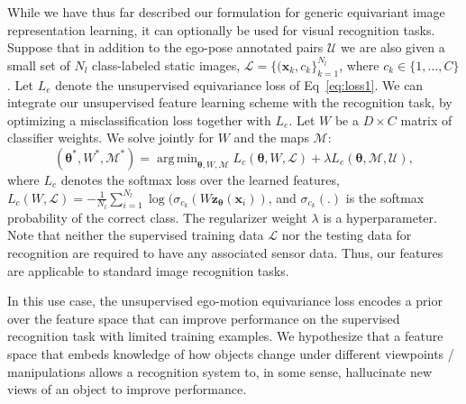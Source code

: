 \documentclass[10pt,twocolumn,letterpaper]{article}
\DeclareMathOperator*{\argmin}{arg\,min}
\newcommand{\newchanges}{}
\newcommand{\changes}{}
\begin{document}
While we have thus far described our formulation for generic equivariant image representation learning, it can optionally be used for visual recognition tasks.
Suppose that in addition to the ego-pose annotated pairs $\mathcal{U}$ we are also given a small set of $N_l$ class-labeled \newchanges{static} images, $\mathcal{L} = \{(\bm{x}_k,c_k\}_{k=1}^{N_l}$, where $c_k \in \{1,\dots,C\}$.
Let $L_e$ denote the unsupervised equivariance loss of Eq~\eqref{eq:loss1}. We can integrate our unsupervised feature learning scheme with the recognition task, by optimizing a misclassification loss together with $L_e$.
Let $W$ be a $D \times C$ matrix of classifier weights. {We solve jointly for $W$ and the maps $\mathcal{M}$}:
\begin{equation}
  (\bm{\theta}^*,W^*,\mathcal{M}^*)=\argmin_{\bm{\theta},W,\mathcal{M}} L_{c}(\changes{\bm{\theta}}, W,\mathcal{L})  + \lambda L_{e}(\bm{\theta}, \mathcal{M},\mathcal{U}),
  \label{eq:recog}
\end{equation}
where $L_c$ denotes the softmax loss over the learned features, $L_c(W,\mathcal{L}) = -\frac{1}{N_l} \sum_{i=1}^{N_l} \log(\sigma_{c_k}(W\mathbf{z}_{\bm{\theta}}(\bm{x}_i))$, and $\sigma_{c_k}(.)$ is the softmax probability of the correct class.
The regularizer weight $\lambda$ is a hyperparameter. \newchanges{Note that neither the supervised training data $\mathcal{L}$ nor the testing data for recognition are required to have any associated sensor data. Thus, our features are applicable to standard image recognition tasks.}%

In this use case, the unsupervised ego-motion equivariance loss encodes a prior over the feature space that can improve performance on the supervised recognition task with limited training examples. \changes{We hypothesize that a feature space that embeds knowledge of how objects change under different viewpoints / manipulations allows a recognition system to, in some sense, hallucinate new views of an object to improve performance.}%
\end{document}
